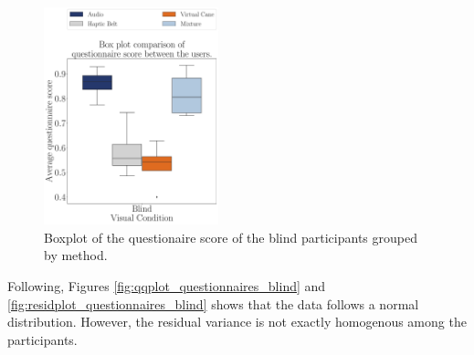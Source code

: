 \begin{figure}[!htb]
    \centering
    \includegraphics[width = 0.45\textwidth]{Resultados/Questionario/Figuras/pdf/boxplot_questionnaire_scene_blind.pdf}
    \caption{Boxplot of the questionaire score of the blind participants grouped by method.}
    \label{fig:boxplot_quest_blind_scene}
\end{figure}

%
%

Following, Figures \ref{fig:qqplot_questionnaires_blind} and \ref{fig:residplot_questionnaires_blind} shows that the data follows a normal distribution. However, the residual variance is not exactly homogenous among the participants. 

